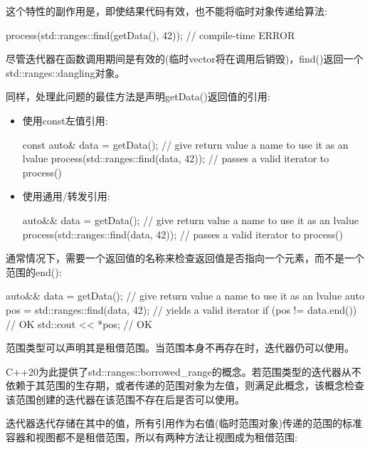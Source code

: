 这个特性的副作用是，即使结果代码有效，也不能将临时对象传递给算法:

\begin{cpp}
process(std::ranges::find(getData(), 42)); // compile-time ERROR
\end{cpp}

尽管迭代器在函数调用期间是有效的(临时vector将在调用后销毁)，find()返回一个std::ranges::dangling对象。

同样，处理此问题的最佳方法是声明getData()返回值的引用:

\begin{itemize}
\item
使用const左值引用:

\begin{cpp}
const auto& data = getData(); // give return value a name to use it as an lvalue
process(std::ranges::find(data, 42)); // passes a valid iterator to process()
\end{cpp}

\item
使用通用/转发引用:

\begin{cpp}
auto&& data = getData(); // give return value a name to use it as an lvalue
process(std::ranges::find(data, 42)); // passes a valid iterator to process()
\end{cpp}
\end{itemize}

通常情况下，需要一个返回值的名称来检查返回值是否指向一个元素，而不是一个范围的end():

\begin{cpp}
auto&& data = getData(); // give return value a name to use it as an lvalue
auto pos = std::ranges::find(data, 42); // yields a valid iterator
if (pos != data.end()) { // OK
	std::cout << *pos; // OK
}
\end{cpp}


范围类型可以声明其是租借范围。当范围本身不再存在时，迭代器仍可以使用。

C++20为此提供了std::ranges::borrowed\_range的概念。若范围类型的迭代器从不依赖于其范围的生存期，或者传递的范围对象为左值，则满足此概念，该概念检查该范围创建的迭代器在该范围不存在后是否可以使用。

迭代器迭代存储在其中的值，所有引用作为右值(临时范围对象)传递的范围的标准容器和视图都不是租借范围，所以有两种方法让视图成为租借范围:

